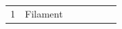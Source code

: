 \begin{table}
\begin{tabular}{|m{1.0cm}|m{2.4cm}|m{6cm}|>{\centering\arraybackslash}m{3.6cm}|m{2.2cm}|m{2.2cm}|m{1.8cm}|}
			1 
			&
			Filament
			&
		\end{tabular}
		
	
\end{table}
	
